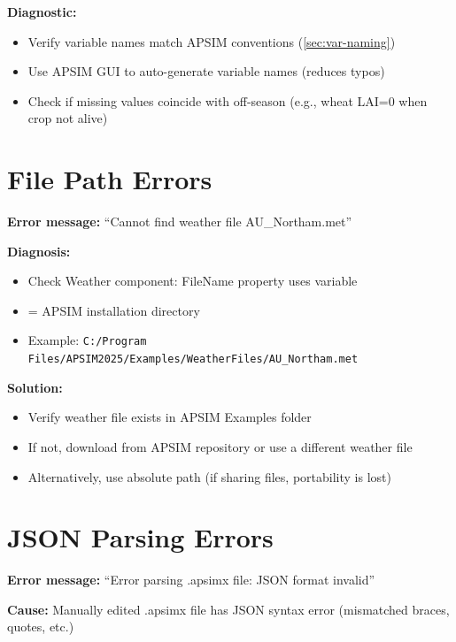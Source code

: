 \textbf{Diagnostic:}
\begin{itemize}
  \item Verify variable names match APSIM conventions (\cref{sec:var-naming})
  \item Use APSIM GUI to auto-generate variable names (reduces typos)
  \item Check if missing values coincide with off-season (e.g., wheat LAI=0 when crop not alive)
\end{itemize}

\section{File Path Errors}

\begin{warningbox}
\textbf{Error message:} ``Cannot find weather file AU\_Northam.met''
\end{warningbox}

\textbf{Diagnosis:}
\begin{itemize}
  \item Check Weather component: FileName property uses  variable
  \item {} = APSIM installation directory
  \item Example: \texttt{C:/Program Files/APSIM2025/Examples/WeatherFiles/AU\_Northam.met}
\end{itemize}

\textbf{Solution:}
\begin{itemize}
  \item Verify weather file exists in APSIM Examples folder
  \item If not, download from APSIM repository or use a different weather file
  \item Alternatively, use absolute path (if sharing files, portability is lost)
\end{itemize}

\section{JSON Parsing Errors}

\begin{warningbox}
\textbf{Error message:} ``Error parsing .apsimx file: JSON format invalid''
\end{warningbox}

\textbf{Cause:} Manually edited .apsimx file has JSON syntax error (mismatched braces, quotes, etc.)

